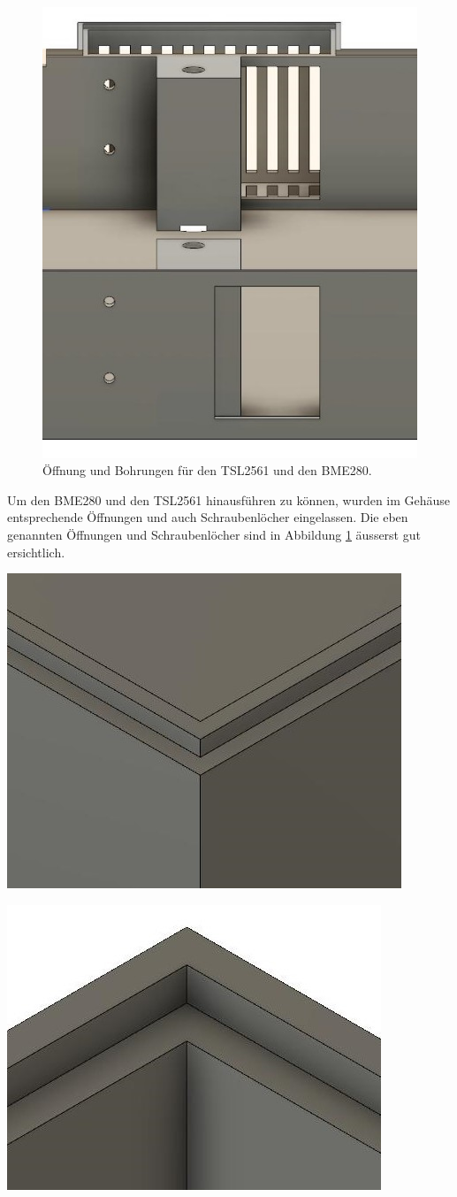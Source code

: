 {\begin{figure}[h]
\centering
\includegraphics[width=0.5\linewidth]{graphics/Gehaeuse/Design_Deckel_TSL.jpg}
\caption{Öffnung und Bohrungen für den TSL2561 und den BME280.}
\label{fig:D:Deckel:TSL}
\end{figure}
Um den BME280 und den TSL2561 hinausführen zu können, wurden im Gehäuse entsprechende Öffnungen und auch Schraubenlöcher eingelassen. Die eben genannten Öffnungen und Schraubenlöcher sind in Abbildung \ref{fig:D:Deckel:TSL} äusserst gut ersichtlich.
\newpage
{\begin{minipage}[b][7cm][t]{0.49\textwidth}
\centering
\includegraphics[width=0.8\linewidth]{graphics/Gehaeuse/Design_Boden_Rand.jpg}
\label{fig:D:Boden:Rand}
\end{minipage}}
{\begin{minipage}[b][7cm][t]{0.49\textwidth}
\centering
\includegraphics[width=0.8\linewidth]{graphics/Gehaeuse/Design_Deckel_Rand.jpg}

\end{minipage}}}
